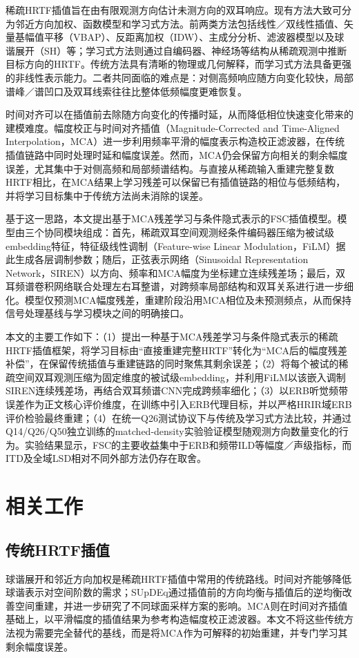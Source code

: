 \documentclass[UTF8,a4paper]{article}
\begin{document}
稀疏HRTF插值旨在由有限观测方向估计未测方向的双耳响应。现有方法大致可分为邻近方向加权、函数模型和学习式方法\cite{R15}。前两类方法包括线性／双线性插值、矢量基幅值平移（VBAP）、反距离加权（IDW）、主成分分析、滤波器模型以及球谐展开（SH）等\cite{R2,R3}；学习式方法则通过自编码器、神经场等结构从稀疏观测中推断目标方向的HRTF\cite{R4,R5}。传统方法具有清晰的物理或几何解释，而学习式方法具备更强的非线性表示能力。二者共同面临的难点是：对侧高频响应随方向变化较快，局部谱峰／谱凹口及双耳线索往往比整体低频幅度更难恢复。

时间对齐可以在插值前去除随方向变化的传播时延，从而降低相位快速变化带来的建模难度\cite{R3}。幅度校正与时间对齐插值（Magnitude-Corrected and Time-Aligned Interpolation，MCA）进一步利用频率平滑的幅度表示构造校正滤波器，在传统插值链路中同时处理时延和幅度误差\cite{R1}。然而，MCA仍会保留方向相关的剩余幅度误差，尤其集中于对侧高频和局部频谱结构。与直接从稀疏输入重建完整复数HRTF相比，在MCA结果上学习残差可以保留已有插值链路的相位与低频结构，并将学习目标集中于传统方法尚未消除的误差。

基于这一思路，本文提出基于MCA残差学习与条件隐式表示的FSC插值模型。模型由三个协同模块组成：首先，稀疏双耳空间观测经条件编码器压缩为被试级embedding特征，特征级线性调制（Feature-wise Linear Modulation，FiLM）\cite{R7}据此生成各层调制参数；随后，正弦表示网络（Sinusoidal Representation Network，SIREN）\cite{R11}以方向、频率和MCA幅度为坐标建立连续残差场；最后，双耳频谱卷积网络联合处理左右耳整谱，对跨频率局部结构和双耳关系进行进一步细化。模型仅预测MCA幅度残差，重建阶段沿用MCA相位及未预测频点，从而保持信号处理基线与学习模块之间的明确接口。

本文的主要工作如下：（1）提出一种基于MCA残差学习与条件隐式表示的稀疏HRTF插值框架，将学习目标由“直接重建完整HRTF”转化为“MCA后的幅度残差补偿”，在保留传统插值与重建链路的同时聚焦其剩余误差；（2）将每个被试的稀疏空间双耳观测压缩为固定维度的被试级embedding，并利用FiLM以该嵌入调制SIREN连续残差场，再结合双耳频谱CNN完成跨频率细化；（3）以ERB听觉频带误差作为正文核心评价维度，在训练中引入ERB代理目标，并以严格HRIR域ERB评价检验最终重建；（4）在统一Q26测试协议下与传统及学习式方法比较，并通过Q14/Q26/Q50独立训练的matched-density实验验证模型随观测方向数量变化的行为。实验结果显示，FSC的主要收益集中于ERB和频带ILD等幅度／声级指标，而ITD及全域LSD相对不同外部方法仍存在取舍。

\section{相关工作}
\label{sec:related}

\subsection{传统HRTF插值}
球谐展开和邻近方向加权是稀疏HRTF插值中常用的传统路线。时间对齐能够降低球谐表示对空间阶数的需求\cite{R3}；SUpDEq通过插值前的方向均衡与插值后的逆均衡改善空间重建，并进一步研究了不同球面采样方案的影响\cite{R2,R2S}。MCA则在时间对齐插值基础上，以平滑幅度的插值结果为参考构造幅度校正滤波器\cite{R1}。本文不将这些传统方法视为需要完全替代的基线，而是将MCA作为可解释的初始重建，并专门学习其剩余幅度误差。
\end{document}
